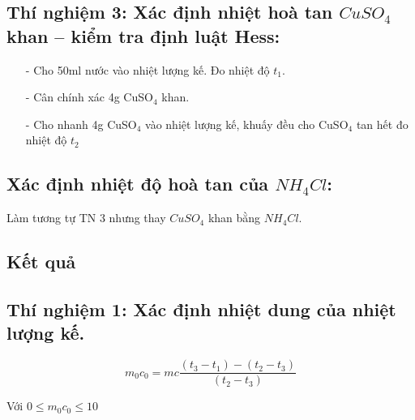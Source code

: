 \documentclass[12pt,a4paper]{report}
\begin{document}
\subsection*{Thí nghiệm 3: Xác định nhiệt hoà tan $CuSO_4$ khan – kiểm tra định luật Hess:}

\begin{itemize}
    \item[-] Cho 50ml nước vào nhiệt lượng kế. Đo nhiệt độ $t_1$.
    \item[-] Cân chính xác 4g CuSO$_4$ khan.
    \item[-] Cho nhanh 4g CuSO$_4$ vào nhiệt lượng kế, khuấy đều cho CuSO$_4$ tan hết đo nhiệt độ $t_2$
\end{itemize}
\subsection*{ Xác định nhiệt độ hoà tan của $NH_4Cl$:}

Làm tương tự TN 3 nhưng thay $CuSO_4$ khan bằng $NH_4Cl$. 
\subsection{Kết quả}
\subsection*{Thí nghiệm 1: Xác định nhiệt dung của nhiệt lượng kế.}

\[
m_0 c_0 = mc \frac{(t_3 - t_1) - (t_2 - t_3)}{(t_2 - t_3)}
\]

Với \( 0 \leq m_0 c_0 \leq 10 \)
\end{document}
